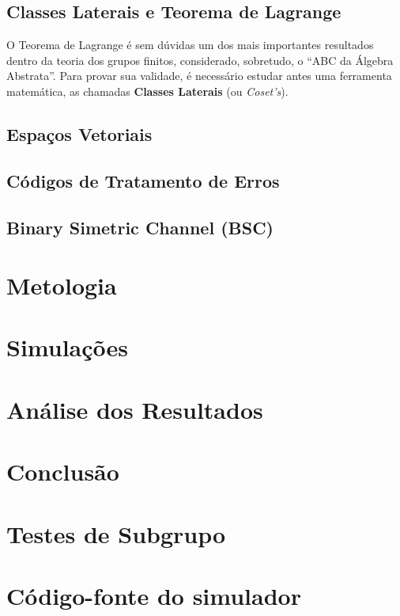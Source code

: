 \documentclass[]{article}
\begin{document}
\subsection{Classes Laterais e Teorema de Lagrange}

\par
O Teorema de Lagrange é sem dúvidas um dos mais importantes resultados dentro da teoria dos grupos finitos, considerado, sobretudo, o “ABC da Álgebra Abstrata”. Para provar sua validade, é necessário estudar antes uma ferramenta matemática, as chamadas \textbf{Classes Laterais} (ou \textit{Coset’s}).



\subsection{Espaços Vetoriais}
\subsection{Códigos de Tratamento de Erros}
\subsection{Binary Simetric Channel (BSC)}

\section{Metologia}
\section{Simulações}

\section{Análise dos Resultados}

\section{Conclusão}

\appendix
\section{Testes de Subgrupo}
\section{Código-fonte do simulador}
\end{document}
